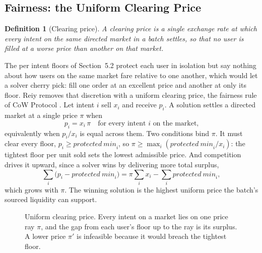\documentclass[10pt,sigconf,nonacm]{acmart}
\theoremstyle{reiythm}
\newtheorem{definition}{Definition}
\begin{document}
\subsection{Fairness: the Uniform Clearing Price}

\begin{definition}[Clearing price]
A clearing price is a single exchange rate at which every intent on the same
directed market in a batch settles, so that no user is filled at a worse price than
another on that market.
\end{definition}

\noindent The per intent floors of Section~5.2 protect each user in isolation but
say nothing about how users on the same market fare relative to one another, which
would let a solver cherry pick: fill one order at an excellent price and another at
only its floor. Reiy removes that discretion with a uniform clearing price, the
fairness rule of CoW Protocol \cite{documentationcowdaoe}. Let intent $i$ sell $x_i$
and receive $p_i$. A solution settles a directed market at a single price $\pi$ when
\[
  p_i = x_i\,\pi \quad\text{for every intent } i \text{ on the market,}
\]
equivalently when $p_i / x_i$ is equal across them. Two conditions bind $\pi$. It
must clear every floor, $p_i \ge \mathit{protected\ min}_i$, so
$\pi \ge \max_i (\mathit{protected\ min}_i / x_i)$: the tightest floor per unit sold
sets the lowest admissible price. And competition drives it upward, since a solver
wins by delivering more total surplus,
\[
  \sum_i \bigl(p_i - \mathit{protected\ min}_i\bigr)
    = \pi \sum_i x_i - \sum_i \mathit{protected\ min}_i,
\]
which grows with $\pi$. The winning solution is the highest uniform price the batch's
sourced liquidity can support.

\begin{figure}[htbp]
  \centering
  \caption{Uniform clearing price. Every intent on a market lies on one price ray
    $\pi$, and the gap from each user's floor up to the ray is its surplus. A lower
    price $\pi'$ is infeasible because it would breach the tightest floor.}
  \label{fig:clearing}
\end{figure}
\end{document}
